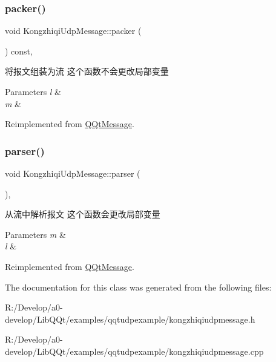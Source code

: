 \subsubsection{\texorpdfstring{packer()}{packer()}}
{\footnotesize\ttfamily void Kongzhiqi\+Udp\+Message\+::packer (\begin{DoxyParamCaption}\item[{Q\+Byte\+Array \&}]{ }\end{DoxyParamCaption}) const\hspace{0.3cm}{\ttfamily [override]}, {\ttfamily [virtual]}}



将报文组装为流 这个函数不会更改局部变量 


\begin{DoxyParams}{Parameters}
{\em l} & \\
\hline
{\em m} & \\
\hline
\end{DoxyParams}


Reimplemented from \mbox{\hyperlink{class_q_qt_message_af1885c2c3628495808dca66ee8d72e14}{Q\+Qt\+Message}}.

\mbox{\label{class_kongzhiqi_udp_message_ae86374489ef208d173e840b050f1b212}} 
\subsubsection{\texorpdfstring{parser()}{parser()}}
{\footnotesize\ttfamily void Kongzhiqi\+Udp\+Message\+::parser (\begin{DoxyParamCaption}\item[{const Q\+Byte\+Array \&}]{ }\end{DoxyParamCaption})\hspace{0.3cm}{\ttfamily [override]}, {\ttfamily [virtual]}}



从流中解析报文 这个函数会更改局部变量 


\begin{DoxyParams}{Parameters}
{\em m} & \\
\hline
{\em l} & \\
\hline
\end{DoxyParams}


Reimplemented from \mbox{\hyperlink{class_q_qt_message_a0bc25669bdd61490b1d8df6d77565f31}{Q\+Qt\+Message}}.



The documentation for this class was generated from the following files\+:\begin{DoxyCompactItemize}
\item 
R\+:/\+Develop/a0-\/develop/\+Lib\+Q\+Qt/examples/qqtudpexample/kongzhiqiudpmessage.\+h\item 
R\+:/\+Develop/a0-\/develop/\+Lib\+Q\+Qt/examples/qqtudpexample/kongzhiqiudpmessage.\+cpp\end{DoxyCompactItemize}
